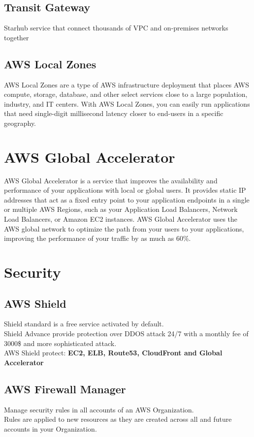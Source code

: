 \documentclass[12pt, letterpaper, twoside]{article}
\begin{document}
\subsection{Transit Gateway}
Starhub service that connect thousands of VPC and on-premises networks together

\subsection{AWS Local Zones}
AWS Local Zones are a type of AWS infrastructure deployment that places AWS compute, storage, database, and other 
select services close to a large population, industry, and IT centers. With AWS Local Zones, you can easily run 
applications that need single-digit millisecond latency closer to end-users in a specific geography.\\

\section{AWS Global Accelerator}
AWS Global Accelerator is a service that improves the availability and performance of your applications with local or global 
users. It provides static IP addresses that act as a fixed entry point to your application endpoints in a single or multiple 
AWS Regions, such as your Application Load Balancers, Network Load Balancers, or Amazon EC2 instances. AWS Global Accelerator 
uses the AWS global network to optimize the path from your users to your applications, improving the performance of your 
traffic by as much as 60\%.


\section{Security}
\subsection{AWS Shield}
Shield standard is a free service activated by default.\\
Shield Advance provide protection over DDOS attack 24/7 with a monthly fee of 3000\$ and more sophisticated attack.\\
AWS Shield protect: \textbf{EC2, ELB, Route53, CloudFront and Global Accelerator}\\

\subsection{AWS Firewall Manager}
Manage security rules in all accounts of an AWS Organization.\\
Rules are applied to new resources as they are created across all and future accounts in your Organization.\\
\end{document}
